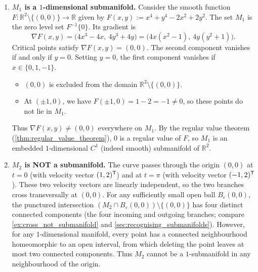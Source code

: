\begin{exercisesolution}
\label{sol:identifying_one_submanifolds_in_plane}
\begin{enumerate}[label=\textbf{(\alph*)}]
  \item \textbf{$M_1$ is a $1$-dimensional submanifold.}
    Consider the smooth function $F : \mathbb{R}^2 \setminus \{(0,0)\} \to \mathbb{R}$ given by
    $F(x,y) := x^4 + y^4 - 2x^2 + 2y^2$. The set $M_1$ is the zero level set $F^{-1}\{0\}$.
    Its gradient is
    \[\nabla F(x,y) = \big(4x^3 - 4x,\ 4y^3 + 4y\big) = \big(4x(x^2-1),\ 4y(y^2+1)\big).\]
    Critical points satisfy $\nabla F(x,y) = (0,0)$. The second component vanishes if and only if $y = 0$.
    Setting $y = 0$, the first component vanishes if $x \in \{0, 1, -1\}$.
    \begin{itemize}
      \item $(0,0)$ is excluded from the domain $\mathbb{R}^2 \setminus \{(0,0)\}$.
      \item At $(\pm 1, 0)$, we have $F(\pm 1, 0) = 1 - 2 = -1 \neq 0$, so these points do not lie in $M_1$.
    \end{itemize}
    Thus $\nabla F(x,y) \neq (0,0)$ everywhere on $M_1$. By the regular value theorem
    (\cref{thm:regular_value_theorem}), $0$ is a regular value of $F$, so $M_1$ is an embedded
    $1$-dimensional $C^1$ (indeed smooth) submanifold of $\mathbb{R}^2$.

  \item \textbf{$M_2$ is NOT a submanifold.}
    The curve passes through the origin $(0,0)$ at $t = 0$ (with velocity vector $(1, 2)^{\mathsf{T}}$) and
    at $t = \pi$ (with velocity vector $(-1, 2)^{\mathsf{T}}$). These two velocity vectors are linearly
    independent, so the two branches cross transversally at $(0,0)$.
    For any sufficiently small open ball $B_\varepsilon(0,0)$, the punctured intersection
    $(M_2 \cap B_\varepsilon(0,0)) \setminus \{(0,0)\}$ has four distinct connected components
    (the four incoming and outgoing branches; compare \cref{ex:cross_not_submanifold} and
    \cref{sec:recognising_submanifolds}). However, for any $1$-dimensional manifold, every point has a
    connected neighbourhood homeomorphic to an open interval, from which deleting the point leaves at
    most two connected components. Thus $M_2$ cannot be a $1$-submanifold in any neighbourhood of the origin.


\end{enumerate}
\end{exercisesolution}
